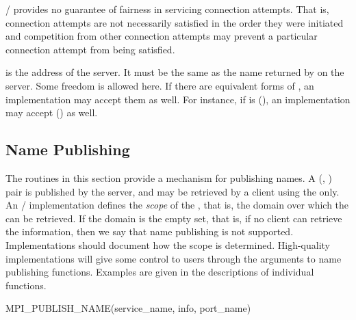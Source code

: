 \MPI/ provides no guarantee of fairness in servicing connection
attempts. That is, connection attempts are not necessarily satisfied
in the order they were initiated and competition from other
connection attempts may prevent a particular connection attempt
from being satisfied.



 is the address of the server.
It must be the same as the name returned
by  on the server. Some
freedom is allowed here. If there are equivalent forms
of , an implementation may accept them
as well. For instance, if  is (),
an implementation may accept () as well.


\subsection{Name Publishing}


The routines in this section provide a mechanism for
publishing names. A (, )
pair is published by the server, and may be retrieved
by a client using the  only.
An \MPI/ implementation defines the \emph{scope} of the ,
that is, the domain over which the 
can be retrieved. If the domain is the empty set, that is,
if no client can retrieve the information, then
we say that name publishing is not supported.
Implementations should document how the scope
is determined. High-quality implementations will
give some control to users through the 
arguments to name publishing functions.
Examples are given in the descriptions of individual functions.

%
\begin{funcdef}{MPI\_PUBLISH\_NAME}{(\mbox{service\_name}, \mbox{info}, \mbox{port\_name})}
\end{funcdef}

